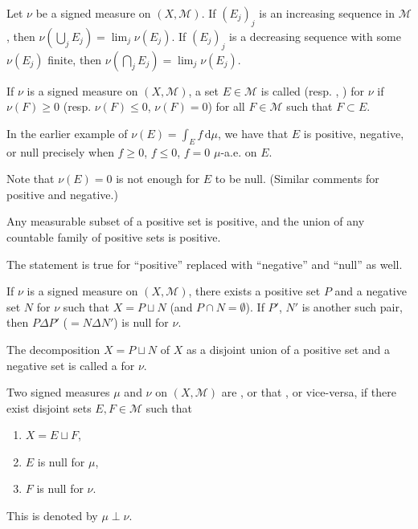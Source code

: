 \documentclass[12pt]{article}	%
\begin{document}
\begin{prop}
	Let $\nu$ be a signed measure on $(X, \mathcal{M})$. If $(E_{j})_{j}$ is an increasing sequence in $\mathcal{M}$, then $\nu(\bigcup_{j} E_{j}) = \lim_{j} \nu(E_{j})$. If $(E_{j})_{j}$ is a decreasing sequence with some $\nu(E_{j})$ finite, then $\nu(\bigcap_{j} E_{j}) = \lim_{j} \nu(E_{j})$.
\end{prop}

\begin{defn}
	If $\nu$ is a signed measure on $(X, \mathcal{M})$, a set $E \in \mathcal{M}$ is called  (resp. , ) for $\nu$ if $\nu(F) \ge 0$ (resp. $\nu(F) \le 0$, $\nu(F) = 0$) for all $F \in \mathcal{M}$ such that $F \subset E$.
\end{defn}
\begin{ex}
	In the earlier example of $\nu(E) = \int_{E} f \,{\mathrm{d}}\mu$, we have that $E$ is positive, negative, or null precisely when $f \ge 0$, $f \le 0$, $f = 0$ $\mu$-a.e. on $E$.
\end{ex}

\begin{rem}
	Note that $\nu(E) = 0$ is not enough for $E$ to be null. (Similar comments for positive and negative.)
\end{rem}

\begin{prop}
	Any measurable subset of a positive set is positive, and the union of any countable family of positive sets is positive.
\end{prop}
The statement is true for ``positive'' replaced with ``negative'' and ``null'' as well.

\begin{thm}
	If $\nu$ is a signed measure on $(X, \mathcal{M})$, there exists a positive set $P$ and a negative set $N$ for $\nu$ such that $X = P \sqcup N$ (and $P \cap N = \emptyset$). \newline
	If $P'$, $N'$ is another such pair, then $P \Delta P'$ ($= N \Delta N'$) is null for $\nu$.
\end{thm}

The decomposition $X = P \sqcup N$ of $X$ as a disjoint union of a positive set and a negative set is called a  for $\nu$.

\begin{defn}
	Two signed measures $\mu$ and $\nu$ on $(X, \mathcal{M})$ are , or that , or vice-versa, if there exist disjoint sets $E, F \in \mathcal{M}$ such that
	\begin{enumerate}
		\item $X = E \sqcup F$,
		\item $E$ is null for $\mu$,
		\item $F$ is null for $\nu$.
	\end{enumerate}
	This is denoted by $\mu \perp \nu$.
\end{defn}
\end{document}
